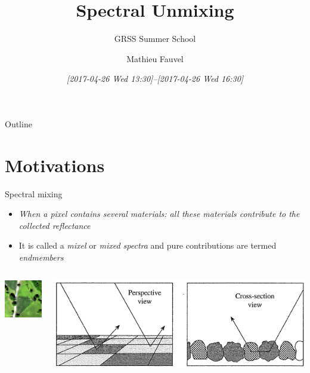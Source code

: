 \documentclass[10pt,aspectratio=1610]{beamer}
\author{Mathieu Fauvel}
\date{\textit{[2017-04-26 Wed 13:30]--[2017-04-26 Wed 16:30]}}
\title{Spectral Unmixing}
\subtitle{GRSS Summer School}
\institute{UMR Dynafor}
\begin{document}
\maketitle
\begin{frame}{Outline}
\tableofcontents
\end{frame}

\section{Motivations}
\label{sec:orgc560228}
\begin{frame}[label={sec:orge8a6fe6}]{Spectral mixing}
\begin{itemize}
\item \emph{When a pixel contains several materials: all these materials contribute to the collected reflectance}~\cite{manolakis2016hyperspectral}
\item It is called a \emph{mixel} or \emph{mixed spectra} and pure contributions are termed \emph{endmembers}
\end{itemize}
\begin{columns}
\begin{column}{0.3\columnwidth}
\begin{center}
\includegraphics[trim=1cm 2cm 2cm 1cm,clip=true,width=4cm]{./figures/46_8.jpg}
\end{center}
\end{column}
\begin{column}{0.7\columnwidth}
\begin{center}
\includegraphics[width=\textwidth]{./figures/mixing_process.png}
\end{center}
\end{column}
\end{columns}
\end{frame}
\end{document}
